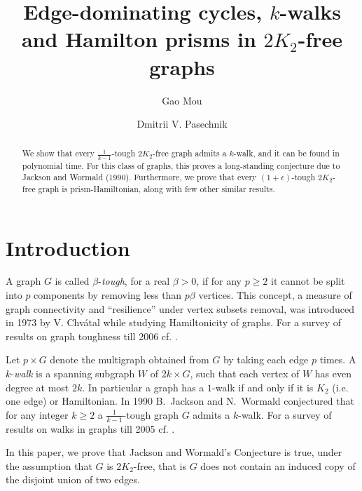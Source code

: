 \documentclass{amsart}
\theoremstyle{definition}
\begin{document}
\author{Gao Mou}
\address{School of Physical and Mathematical Sciences, Nanyang Technological University, Singapore} 
\author{Dmitrii V. Pasechnik}
\address{Department of Computer Science, The University of Oxford, UK}

\title{Edge-dominating cycles, $k$-walks and Hamilton prisms in $2K_2$-free graphs}
\begin{abstract}
We show that every $\frac{1}{k-1}$-tough
$2K_2$-free graph admits a $k$-walk, and it can be found in polynomial time.
For this class of graphs, this proves a
long-standing conjecture due to Jackson and Wormald (1990).
Furthermore, we prove that every $(1+\epsilon)$-tough $2K_2$-free graph is prism-Hamiltonian,
along with few other similar results.
\end{abstract}

\maketitle

\section{Introduction}
A graph $G$ is called $\beta$-{\em tough}, for a real $\beta>0$, if for any $p\geq 2$ it
cannot be split into $p$ components by removing less than $p\beta$ vertices.  
This concept, a measure of graph connectivity and ``resilience'' under vertex subsets removal,
was introduced in 1973 by V. Chv\'{a}tal 
while studying   Hamiltonicity of graphs. For a survey of results on graph toughness till 2006
cf. \cite{MR2221006}.

Let $p\times G$ denote the multigraph obtained from $G$ by taking each edge $p$ times. 
A $k$-{\em walk} is a spanning subgraph $W$ of $2k\times G$, such that each vertex of $W$ 
has even degree at most $2k$. %
In particular a graph has a $1$-walk if and only if it is $K_2$ (i.e. one edge) or Hamiltonian.
In 1990 B.~Jackson and N.~Wormald conjectured \cite{jackson1990k} that for any integer $k\ge2$ a
$\frac{1}{k-1}$-tough graph $G$ admits a $k$-walk.
{For a survey of results on walks in graphs till 2005 cf. \cite{kouider2005connected}.}

In this paper, we prove that Jackson and Wormald's Conjecture is true, under the
assumption that $G$ is  $2K_2$-free, that is $G$ does not contain an induced
copy of the disjoint union of two edges. 
\end{document}
